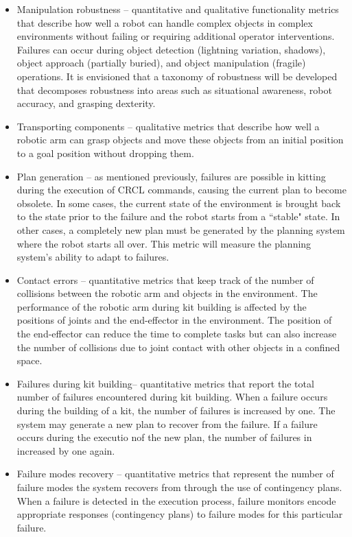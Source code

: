 \begin{itemize}
\item \sf Manipulation robustness \rm -- quantitative and qualitative functionality metrics that describe how well a robot can handle complex objects in complex environments without failing or requiring additional operator interventions. Failures can occur during object detection (lightning variation, shadows), object approach (partially buried), and object manipulation (fragile) operations.
It is envisioned that a taxonomy of robustness will be developed that decomposes robustness into areas such as situational awareness, robot accuracy, and grasping dexterity.\\

\item \sf Transporting components \rm -- qualitative metrics that describe how well a robotic arm can grasp objects and move these objects from an initial position to a goal position without dropping them.\\

\item \sf Plan generation \rm -- as mentioned previously, failures are possible in kitting during the execution of CRCL commands, causing the current plan to become obsolete. In some cases, the current state of the environment is brought back to the state prior to the failure and the robot starts from a ``stable" state. In other cases, a completely new plan must be generated by the planning system where the robot starts all over. This metric will measure the planning system\rq{}s ability to adapt to failures.\\

\item \sf Contact errors \rm -- quantitative metrics that keep track of the number of collisions between the robotic arm and objects in the environment. The performance of the robotic arm during kit building is affected by the positions of joints and the end-effector in the environment. The position of the end-effector can reduce the time to complete tasks but can also increase the number of collisions due to joint contact with other objects in a confined space.\\

\item \sf Failures during kit building\rm -- quantitative metrics that report the total number of failures encountered during kit building. When a failure occurs during the
building of a kit, the number of failures is increased by one. The system may generate a new plan to recover from the failure. If a failure occurs during the executio nof the new
plan, the number of failures in increased by one again.\\

\item \sf Failure modes recovery \rm -- quantitative metrics that represent the number of failure modes the system recovers from through the use of contingency plans. When a failure is detected in the execution process, failure monitors encode appropriate responses (contingency plans) to failure modes for this particular failure.\\

\end{itemize}
